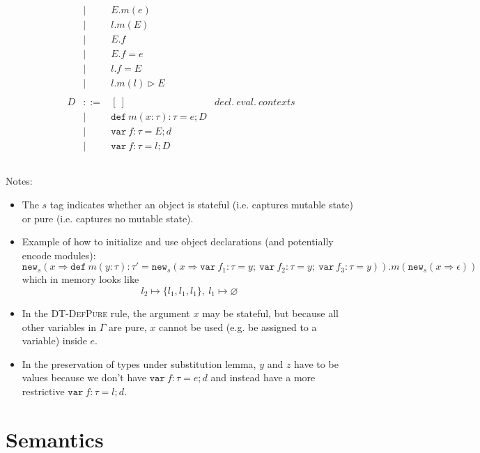 \documentclass{llncs}
\newcommand{\keywadj}[1]{\mathtt{#1}}
\newcommand{\keyw}[1]{\keywadj{#1}~}
\begin{document}
\[\begin{array}{lll}
\begin{array}{lllr}
  & |   & E.m(e)\\
  & |   & l.m(E)\\
  & |   & E.f \\
  & |   & E.f = e \\
  & |   & l.f = E \\
  & |   & l.m(l) \rhd E \\
&&\\
D & ::= & [~] & decl.~eval.~ contexts\\
  & |   & \keyw{def} m(x:\tau):\tau = e; D \\
  & |   & \keyw{var} f:\tau = E; d \\
  & |   & \keyw{var} f:\tau = l; D \\
&&\\
\end{array}
\end{array}
\]

\noindent Notes:

\begin{itemize}
\item The $s$ tag indicates whether an object is stateful (i.e. captures mutable state) or pure (i.e. captures no mutable state).
\item Example of how to initialize and use object declarations (and potentially encode modules):
\[
\keywadj{new}_{s}(x \Rightarrow \keyw{def} m(y : \tau) : \tau' = \keywadj{new}_{s}(x \Rightarrow \keyw{var} f_1 : \tau = y;~\keyw{var} f_2 : \tau = y;~\keyw{var} f_3 : \tau = y)).m(\keywadj{new}_{s} (x \Rightarrow \epsilon))
\]
which in memory looks like 
\[
l_2 \mapsto \{l_1,l_1,l_1\},~l_1 \mapsto \varnothing
\]
\item In the \textsc{DT-DefPure} rule, the argument $x$ may be stateful, but because all other variables in $\Gamma$ are pure, $x$ cannot be used (e.g. be assigned to a variable) inside $e$.
\item In the preservation of types under substitution lemma, $y$ and $z$ have to be values because we don't have $\keyw{var} f:\tau = e; d$ and instead have a more restrictive $\keyw{var} f:\tau = l;d$.
\end{itemize}


\newpage

\section{Semantics}
\end{document}
